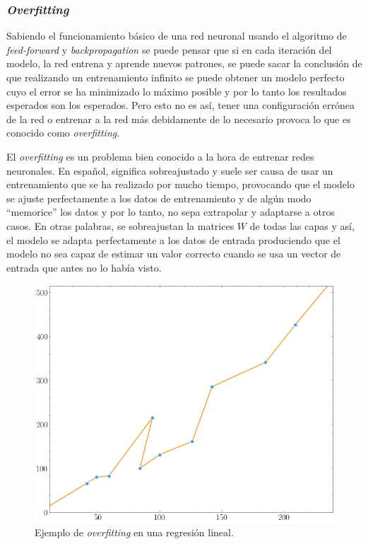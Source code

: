 \subsubsection{\textit{Overfitting}}\label{overfitting}

Sabiendo el funcionamiento básico de una red neuronal usando el algoritmo de \textit{feed-forward} y \textit{backpropagation} se puede pensar que si en cada iteración del modelo, la red entrena y aprende nuevos patrones, se puede sacar la conclusión de que realizando un entrenamiento infinito se puede obtener un modelo perfecto cuyo el error se ha minimizado lo máximo posible y por lo tanto los resultados esperados son los esperados. Pero esto no es así, tener una configuración errónea de la red o entrenar a la red más debidamente de lo necesario provoca lo que es conocido como \textit{overfitting}.
\newline

El \textit{overfitting} es un problema bien conocido a la hora de entrenar redes neuronales. En español, significa sobreajustado y suele ser causa de usar un entrenamiento que se ha realizado por mucho tiempo, provocando que el modelo se ajuste perfectamente a los datos de entrenamiento y de algún modo “memorice” los datos y por lo tanto, no sepa extrapolar y adaptarse a otros casos. En otras palabras, se sobreajustan la matrices $W$ de todas las capas y así, el modelo se adapta perfectamente a los datos de entrada produciendo que el modelo no sea capaz de estimar un valor correcto cuando se usa un vector de entrada que antes no lo había visto.

\begin{figure}[H]
    \centering
    \includegraphics[width=12cm]{images/state-of-art/overfitting/overfitting.png}
    \caption{Ejemplo de \textit{overfitting} en una regresión lineal.}
    \label{fig:basic_network}
\end{figure}

